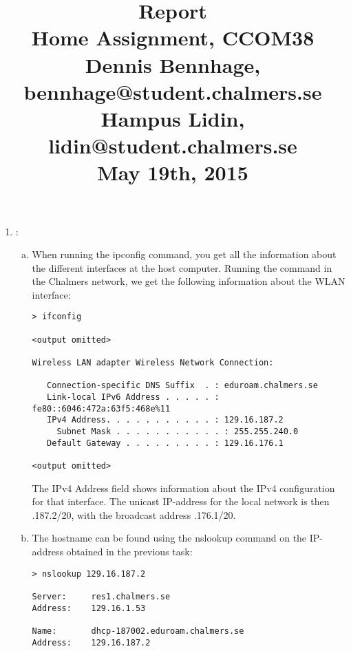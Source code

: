 \documentclass[a4paper,9pt,fleqn]{article}
\title{
{\bf Report}\\
\vspace{0.2cm}
%
Home Assignment, CCOM38\\
\vspace{1cm}
%
{
\large
Dennis Bennhage,	bennhage@student.chalmers.se \\
Hampus Lidin,	lidin@student.chalmers.se
}
\\
\vspace{10cm}
%
May 19th, 2015
}
\date{}
\begin{document}
\maketitle

\newpage

\begin{enumerate}[{Task} 1]
	\item :
	\begin{enumerate}[a)]
		\item 
		When running the {\outp ipconfig} command, you get all the
		information about the different interfaces at the host computer. Running the
		command in the Chalmers network, we get the following information
		about the WLAN interface:
			
\begin{lstlisting}
> ifconfig

<output omitted>

Wireless LAN adapter Wireless Network Connection:

   Connection-specific DNS Suffix  . : eduroam.chalmers.se
   Link-local IPv6 Address . . . . . : fe80::6046:472a:63f5:468e%11
   IPv4 Address. . . . . . . . . . . : 129.16.187.2
	 Subnet Mask . . . . . . . . . . . : 255.255.240.0
   Default Gateway . . . . . . . . . : 129.16.176.1

<output omitted>
\end{lstlisting}

		The {\outp IPv4 Address} field shows information about the IPv4 configuration for that
		interface. The unicast IP-address for the local network is then {.187.2/20},
		with the broadcast address {.176.1/20}. %
    \\
		\item 
		The hostname can be found using the {\outp nslookup} command on the IP-address
		obtained in the previous task:

\begin{lstlisting}
> nslookup 129.16.187.2

Server:		res1.chalmers.se
Address:	129.16.1.53

Name:		dhcp-187002.eduroam.chalmers.se
Address:	129.16.187.2
\end{lstlisting}


\end{enumerate}
\end{enumerate}
\end{document}
